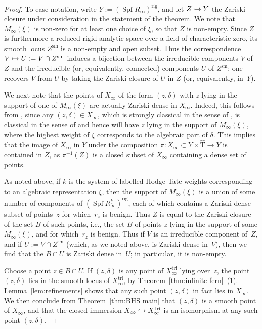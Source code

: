 \documentclass[11pt]{article}
\newcommand{\ie}{i.e.,\xspace}
\newcommand\mto{\mathchoice{\longmapsto}{\mapsto}{\mapsto}{\mapsto}}
\newcommand\hto{\mathrel{\lhook\joinrel\to}}
\theoremstyle{definition}
\DeclareMathOperator{\Spf}{Spf}
\newcommand{\sm}{\mathrm{sm}}
\newcommand\rig{\mathrm{rig}}
\newcommand\tri{\mathrm{tri}}
\begin{document}
\begin{proof}
To ease notation, write $Y := (\Spf R_{\infty})^{\rig}$,
and let $Z \hto Y$ the Zariski closure under consideration in the
statement of the theorem.
We note that $M_{\infty}(\xi)$ is non-zero for at least one choice of $\xi$,
so that $Z$ is non-empty.
Since $Z$ is furthermore a reduced rigid analytic space over a field
of characteristic zero, its smooth locus $Z^{\sm}$ is a non-empty and open subset.
Thus the correspondence $V \mto U := V \cap Z^{\sm}$
induces a bijection between the irreducible components $V$ of $Z$
and the irreducible (or, equivalently, connected) components $U$ of $Z^{\sm}$; one recovers $V$ from
$U$ by taking the Zariski closure of $U$ in $Z$ (or, equivalently, in~$Y$).

We next note that the points of $X_{\infty}$ of the form $(z,\delta)$
with $z$ lying in the support of one of $M_{\infty}(\xi)$
are actually Zariski dense
in $X_{\infty}$. Indeed,
this follows from \cite[Th.\,3.19]{BHS},
since any $(z,\delta)\in X_{\infty}$, which is strongly classical in the sense of \cite[Def.\,3.15]{BHS}, is classical
in the sense of \cite[Def.\,3.17]{BHS} and hence will have $z$ lying in the support of $M_{\infty}(\xi)$, where the highest weight of $\xi$ corresponds to the algebraic part of $\delta$.
This implies that the image of $X_{\infty}$ in $Y$ under the composition $\pi: X_{\infty}\subset Y\times \widehat{\mathrm{T}} \to Y$ is contained in $Z$, as $\pi^{-1}(Z)$ is a closed subset of $X_{\infty}$ containing a dense set of points.

As noted above,
if $\underline{k}$ is the system of labelled
Hodge-Tate weights corresponding to an algebraic representation $\xi$,
then the support of $M_{\infty}(\xi)$
is a union of some number of components of
$(\Spf R_{\infty}^{\underline{k}})^{\rig}$,
each of which contains a Zariski dense subset of points~$z$ for which~$r_z$ is benign. Thus $Z$ is equal to the Zariski
closure of the set $B$ of such points, \ie
the set $B$ of points $z$ lying in the support of some $M_{\infty}(\xi)$,
and for which~$r_z$ is benign.
Thus if $V$ is an irreducible component of~$Z$,
and if $U := V \cap Z^{\sm}$ (which, as we noted above, is Zariski
dense in~$V$),
then we find that the $B \cap U$ is Zariski dense in~$U$; in particular,
it is non-empty.

Choose a point $z \in B \cap U$.
If $(z,\delta)$ is any point of $X^{\tri}_{\infty}$
lying over~$z$,
the point $(z,\delta)$ lies in the smooth
locus of $X^{\tri}_{\infty}$, by Theorem~\ref{thm:infinite fern}~(1).
Lemma~\ref{lem:refinements} shows
that any such point $(z,\delta)$
in fact lies in $X_{\infty}$.
We then conclude from
Theorem~\ref{thm:BHS main}
that $(z,\delta)$ is a smooth point of $X_{\infty}$, and that the closed
immersion
$X_{\infty} \hto X^{\tri}_{\infty}$ is an isomorphism
at any such point $(z,\delta)$.


\end{proof}
\end{document}
